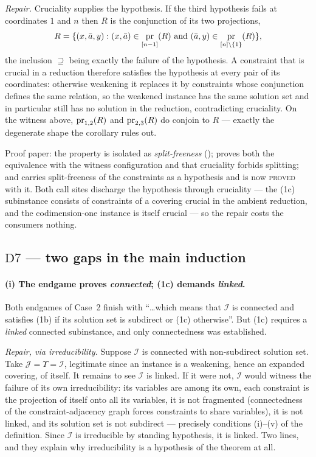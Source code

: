 \emph{Repair.} Cruciality supplies the hypothesis. If the third hypothesis
fails at coordinates $1$ and $n$ then $R$ is the conjunction of its two
projections,
\[
  R=\{(x,\bar a,y):(x,\bar a)\in\proj_{[n-1]}(R)\ \text{and}\
     (\bar a,y)\in\proj_{[n]\setminus\{1\}}(R)\},
\]
the inclusion $\supseteq$ being exactly the failure of the hypothesis. A
constraint that is crucial in a reduction therefore satisfies the hypothesis at
every pair of its coordinates: otherwise weakening it replaces it by
constraints whose conjunction defines the same relation, so the weakened
instance has the same solution set and in particular still has no solution in
the reduction, contradicting cruciality. On the witness above,
$\operatorname*{pr}_{1,2}(R)$ and $\operatorname*{pr}_{2,3}(R)$ do conjoin to $R$ --- exactly the
degenerate shape the corollary rules out.

Proof paper: the property is isolated as \emph{split-freeness}
();  proves both the equivalence
with the witness configuration and that cruciality forbids splitting; and
\pkey{lem:connected} carries split-freeness of the constraints as a
hypothesis and is now \textsc{proved} with it. Both call sites discharge the
hypothesis through cruciality --- the (1c) subinstance consists of
constraints of a covering crucial in the ambient reduction, and the
codimension-one instance is itself crucial --- so the repair costs the
consumers nothing.

\subsection{$\mathrm D7$ --- two gaps in the main induction}\label{sec:D7}

\paragraph{(i) The endgame proves \emph{connected}; (1c) demands \emph{linked}.}
Both endgames of Case~2 finish with ``\dots which means that $\mathcal I$ is
connected and satisfies (1b) if its solution set is subdirect or (1c)
otherwise''. But (1c) requires a \emph{linked} connected subinstance, and only
connectedness was established.

\emph{Repair, via irreducibility.} Suppose $\mathcal I$ is connected with
non-subdirect solution set. Take $\mathcal J=\Upsilon=\mathcal I$, legitimate
since an instance is a weakening, hence an expanded covering, of itself. It
remains to see $\mathcal I$ is linked. If it were not, $\mathcal I$ would
witness the failure of its own irreducibility: its variables are among its own,
each constraint is the projection of itself onto all its variables, it is not
fragmented (connectedness of the constraint-adjacency graph forces constraints
to share variables), it is not linked, and its solution set is not subdirect
--- precisely conditions (i)--(v) of the definition. Since $\mathcal I$ is
irreducible by standing hypothesis, it is linked. Two lines, and they explain
why irreducibility is a hypothesis of the theorem at all.

